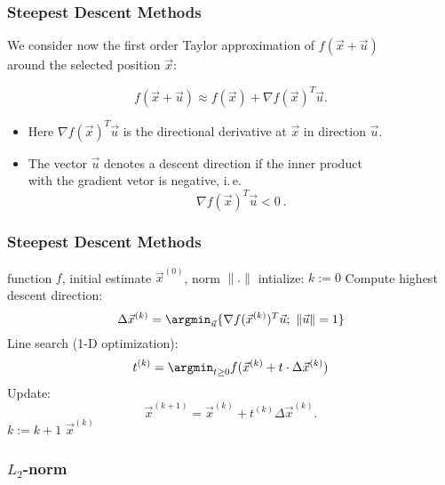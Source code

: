 \begin{frame}
  \frametitle{Steepest Descent Methods \cont}

  We consider now the first order Taylor approximation of $f(\vec x +\vec u)$ \\
  around the selected position $\vec x$:
  
  \begin{displaymath}
    f(\vec x+\vec u) \approx f(\vec x) + \nabla f(\vec x)^T \vec u.
  \end{displaymath}
  \pause
  
  \begin{itemize}
    \item Here $ \nabla f(\vec x)^T \vec u$ is the directional derivative at $\vec x$ in direction $\vec u$.
    \item The vector $\vec u$ denotes a descent direction if the inner product \\
      with the gradient vetor is negative, i.\,e.
      \begin{displaymath}
        \nabla f(\vec x)^T \vec u < 0~.
      \end{displaymath}
  \end{itemize}
\end{frame}


\begin{frame}
  \frametitle{Steepest Descent Methods \cont}

  \vspace*{-.25cm}
  \begin{algorithmic}
    \STATE {} function $f$, initial estimate $\vec x^{(0)}$, norm $\|.\|$
    \STATE intialize: $k:=0$
    \REPEAT
      \STATE Compute highest descent direction: $$ \Delta \vec x ^{(k)}= \argmin_{\vec u} \{\nabla f(\vec x^{(k)})^T \vec u ; \ \| \vec u\| = 1\}$$    
      \STATE Line search (1-D optimization): $$t^{(k)}= \argmin_{t \geq 0}f(\vec x^{(k)}+t\cdot \Delta\vec x^{(k)})$$
      \STATE Update:
        \begin{displaymath}
          \vec x^{(k+1)} = \vec x^{(k)} + t^{(k)}\Delta \vec x^{(k)} .
        \end{displaymath}
      \STATE $k:=k+1$
    \STATE {} $\vec x^{(k)}$
  \end{algorithmic}
\end{frame}


\subsubsection{$L_2$-norm}

